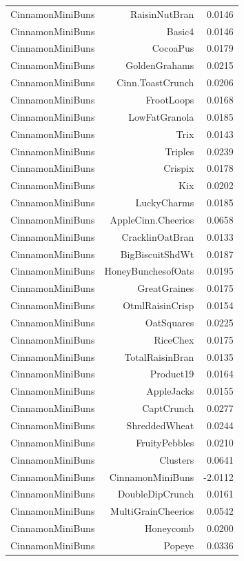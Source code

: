 \begin{longtable}{@{}lrr@{}}
CinnamonMiniBuns & RaisinNutBran & 0.0146 \\
CinnamonMiniBuns & Basic4 & 0.0146 \\
CinnamonMiniBuns & CocoaPus & 0.0179 \\
CinnamonMiniBuns & GoldenGrahams & 0.0215 \\
CinnamonMiniBuns & Cinn.ToastCrunch & 0.0206 \\
CinnamonMiniBuns & FrootLoops & 0.0168 \\
CinnamonMiniBuns & LowFatGranola & 0.0185 \\
CinnamonMiniBuns & Trix & 0.0143 \\
CinnamonMiniBuns & Triples & 0.0239 \\
CinnamonMiniBuns & Crispix & 0.0178 \\
CinnamonMiniBuns & Kix & 0.0202 \\
CinnamonMiniBuns & LuckyCharms & 0.0185 \\
CinnamonMiniBuns & AppleCinn.Cheerios & 0.0658 \\
CinnamonMiniBuns & CracklinOatBran & 0.0133 \\
CinnamonMiniBuns & BigBiscuitShdWt & 0.0187 \\
CinnamonMiniBuns & HoneyBunchesofOats & 0.0195 \\
CinnamonMiniBuns & GreatGraines & 0.0175 \\
CinnamonMiniBuns & OtmlRaisinCrisp & 0.0154 \\
CinnamonMiniBuns & OatSquares & 0.0225 \\
CinnamonMiniBuns & RiceChex & 0.0175 \\
CinnamonMiniBuns & TotalRaisinBran & 0.0135 \\
CinnamonMiniBuns & Product19 & 0.0164 \\
CinnamonMiniBuns & AppleJacks & 0.0155 \\
CinnamonMiniBuns & CaptCrunch & 0.0277 \\
CinnamonMiniBuns & ShreddedWheat & 0.0244 \\
CinnamonMiniBuns & FruityPebbles & 0.0210 \\
CinnamonMiniBuns & Clusters & 0.0641 \\
CinnamonMiniBuns & CinnamonMiniBuns & -2.0112 \\
CinnamonMiniBuns & DoubleDipCrunch & 0.0161 \\
CinnamonMiniBuns & MultiGrainCheerios & 0.0542 \\
CinnamonMiniBuns & Honeycomb & 0.0200 \\
CinnamonMiniBuns & Popeye & 0.0336 \\

\end{longtable}
